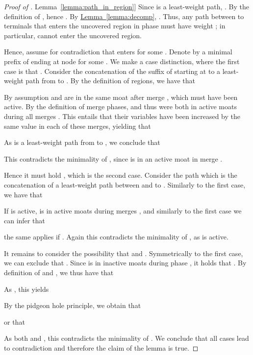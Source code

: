 \documentclass[letterpaper,11pt]{article}
\newcommand{\namedref}[2]{\hyperref[#2]{#1~\ref*{#2}}}
\newcommand{\lemmaref}[1]{\namedref{Lemma}{#1}}
\begin{document}
\begin{proof}[Proof of \lemmaref{lemma:path_in_region}]
Since  is a least-weight path, . By the definition of
, hence . By \lemmaref{lemma:decomp},
.
Thus, any path  between to terminals that enters the uncovered region in
phase  must have weight ; in particular,  cannot enter the
uncovered region.

Hence, assume for contradiction that  enters  for some . Denote by  a minimal prefix of  ending at node 
for some . We make a case distinction, where the first case is that
. Consider the concatenation  of the suffix of  starting
at  to a least-weight path from  to . By the definition of regions, we
have that

By assumption  and  are in the same moat after merge , which must
have been active. By the definition of merge phases,  and  thus were
both in active moats during all merges . This entails
that their  variables have been increased by the same value in each of
these merges, yielding that

As  is a least-weight path from  to , we conclude that

This contradicts the minimality of , since  is in an active moat in
merge .


Hence it must hold , which is the second case. Consider
the path  which is the concatenation of a least-weight path between  and
 to . Similarly to the first case, we have that

If  is active,  is in active moats during merges , and similarly to the first case we can infer that

the same applies if . Again this contradicts the
minimality of , as  is active. 

It remains to consider the possibility that  and
. Symmetrically to the first case, we can exclude that
. Since  is in inactive moats during phase , it holds that
. By definition of  and , we
thus have that

As , this
yields

By the pidgeon hole principle, we obtain that

or that

As both  and , this contradicts the minimality of . We conclude that all
cases lead to contradiction and therefore the claim of the lemma is true.
\end{proof}
\end{document}
